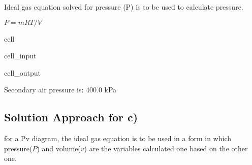 \documentclass[letterpaper,10pt,english]{jupyterBook}
\begin{document}
\sphinxAtStartPar
Ideal gas equation solved for pressure (P) is to be used to calculate pressure.

\sphinxAtStartPar
\(P=mRT/V\)

\begin{sphinxuseclass}{cell}\begin{sphinxVerbatimInput}

\begin{sphinxuseclass}{cell_input}
\begin{sphinxVerbatim}[commandchars=\\\{\}]
     

         
  
\end{sphinxVerbatim}

\end{sphinxuseclass}\end{sphinxVerbatimInput}
\begin{sphinxVerbatimOutput}

\begin{sphinxuseclass}{cell_output}
\begin{sphinxVerbatim}[commandchars=\\\{\}]
Secondary air pressure is: 400.0 kPa
\end{sphinxVerbatim}

\end{sphinxuseclass}\end{sphinxVerbatimOutput}

\end{sphinxuseclass}

\subsection{Solution Approach for c)}
\label{\detokenize{notebooks/Chapter3/CH3-Q3_edited_edited:solution-approach-for-c}}
\sphinxAtStartPar
for a P\sphinxhyphen{}v diagram, the ideal gas equation is to be used in a form in which pressure(\(P\)) and volume(\(v\)) are the variables calculated one based on the other one.
\end{document}
